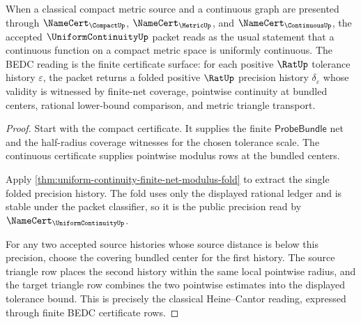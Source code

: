 \begin{theorem}
\label{thm:uniform-continuity-compact-continuous-standard-reading}
When a classical compact metric source and a continuous graph are presented
through $\NameCert_{\CompactUp}$, $\NameCert_{\MetricUp}$, and
$\NameCert_{\ContinuousUp}$, the accepted $\UniformContinuityUp$ packet reads
as the usual statement that a continuous function on a compact metric space is
uniformly continuous. The BEDC reading is the finite certificate surface:
for each positive $\RatUp$ tolerance history $\varepsilon$, the packet returns
a folded positive $\RatUp$ precision history $\delta_\varepsilon$ whose
validity is witnessed by finite-net coverage, pointwise continuity at bundled
centers, rational lower-bound comparison, and metric triangle transport.
\end{theorem}
\begin{proof}
Start with the compact certificate. It supplies the finite
$\mathsf{ProbeBundle}$ net and the half-radius coverage witnesses for the
chosen tolerance scale. The continuous certificate supplies pointwise modulus
rows at the bundled centers.

Apply \autoref{thm:uniform-continuity-finite-net-modulus-fold} to extract the
single folded precision history. The fold uses only the displayed rational
ledger and is stable under the packet classifier, so it is the public precision
read by $\NameCert_{\UniformContinuityUp}$.

For any two accepted source histories whose source distance is below this
precision, choose the covering bundled center for the first history. The source
triangle row places the second history within the same local pointwise radius,
and the target triangle row combines the two pointwise estimates into the
displayed tolerance bound. This is precisely the classical Heine--Cantor
reading, expressed through finite BEDC certificate rows.
\end{proof}

